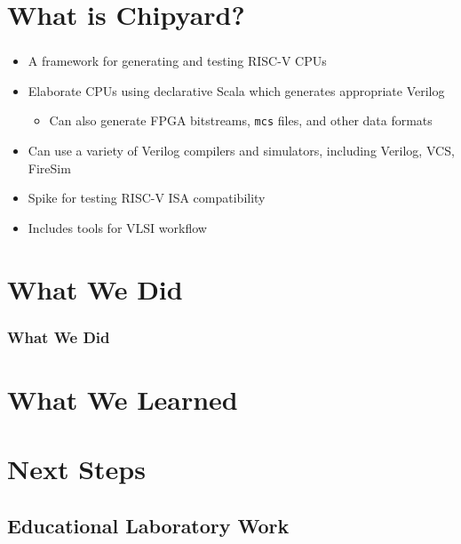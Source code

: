 \documentclass{eceday}
\begin{document}
\section{What is Chipyard?}\label{sec:What_is_Chipyard}
\begin{frame}
  \frametitle{}
  \begin{itemize}
  \item A framework for generating and testing RISC-V CPUs
  \item Elaborate CPUs using declarative Scala which generates appropriate Verilog
    \begin{itemize}
    \item Can also generate FPGA bitstreams, \texttt{mcs} files, and other data formats
    \end{itemize}
  \item Can use a variety of Verilog compilers and simulators, including Verilog, VCS, FireSim
  \item Spike for testing RISC-V ISA compatibility
  \item Includes tools for VLSI workflow
  \end{itemize}
\end{frame}

\section{What We Did}\label{sec:What_We_Did}
\begin{frame}
  \frametitle{What We Did}
\end{frame}

\section{What We Learned}\label{sec:What_We_Learned}
\begin{frame}
  \frametitle{}
  
\end{frame}

\section{Next Steps}\label{sec:Next_Steps}
\subsection{Educational Laboratory Work}\label{subsec:Educational_Lab_Work}
\begin{frame}
  \frametitle{}
\end{frame}
\end{document}
